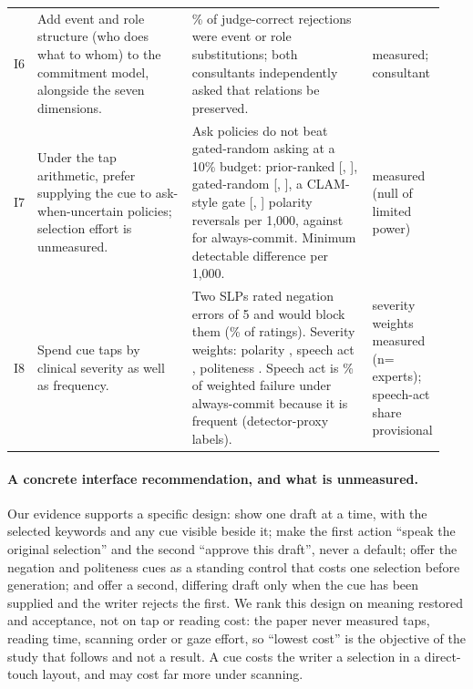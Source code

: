 \begin{table}[t]
\begin{tabular}{@{}p{0.04\linewidth}p{0.36\linewidth}p{0.42\linewidth}p{0.12\linewidth}@{}}
I6 & Add event and role structure (who does what to whom) to the commitment model, alongside the seven dimensions. & \jmwmRightSubst{}\% of judge-correct rejections were event or role substitutions; both consultants independently asked that relations be preserved. & measured; consultant \\
I7 & Under the tap arithmetic, prefer supplying the cue to ask-when-uncertain policies; selection effort is unmeasured. & Ask policies do not beat gated-random asking at a 10\% budget: prior-ranked \jmdpAskPriorPol{} [\jmdpAskPriorPolLo{}, \jmdpAskPriorPolHi{}], gated-random \jmdpAskRandPol{} [\jmdpAskRandPolLo{}, \jmdpAskRandPolHi{}], a CLAM-style gate \jmclamPol{} [\jmclamPolLo{}, \jmclamPolHi{}] polarity reversals per 1,000, against \jmdpAlwaysCommitPol{} for always-commit. Minimum detectable difference \jmdpMdePol{} per 1,000. & measured (null of limited power) \\
I8 & Spend cue taps by clinical severity as well as frequency. & Two SLPs rated negation errors \jmslpNegSeverity{} of 5 and would block them (\jmslpNegBlock{}\% of ratings). Severity weights: polarity \jmwPol{}, speech act \jmwAct{}, politeness \jmwPolite{}. Speech act is \jmwShareAct{}\% of weighted failure under always-commit because it is frequent (detector-proxy labels). & severity weights measured (n=\jmdesignSlp{} experts); speech-act share provisional \\
\bottomrule
\end{tabular}
\end{table}

\paragraph{A concrete interface recommendation, and what is unmeasured.}
Our evidence supports a specific design: show one draft at a time, with the selected keywords and any cue visible beside it; make the first action ``speak the original selection'' and the second ``approve this draft'', never a default; offer the negation and politeness cues as a standing control that costs one selection before generation; and offer a second, differing draft only when the cue has been supplied and the writer rejects the first. We rank this design on meaning restored and acceptance, not on tap or reading cost: the paper never measured taps, reading time, scanning order or gaze effort, so ``lowest cost'' is the objective of the study that follows and not a result. A cue costs the writer a selection in a direct-touch layout, and may cost far more under scanning.

